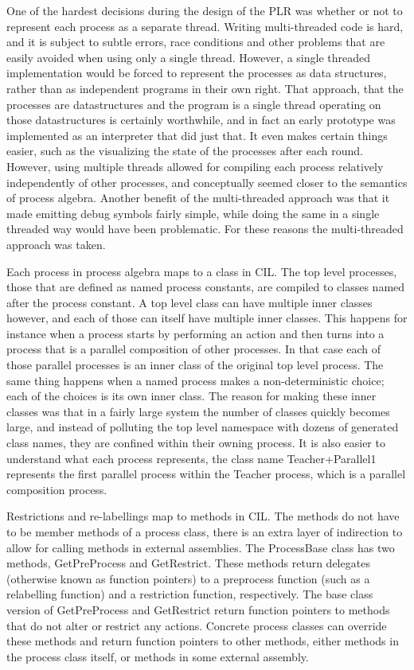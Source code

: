 	One of the hardest decisions during the design of the PLR was whether or not 
	to represent each process as a separate thread. Writing multi-threaded code 
	is hard, and it is subject to subtle errors, race conditions and other 
	problems that are easily avoided when using only a single thread. However, a 
	single threaded implementation would be forced to represent the processes as 
	data structures, rather than as independent programs in their own right. 
	That approach, that the processes are datastructures and the program is a 
	single thread operating on those datastructures is certainly worthwhile, and 
	in fact an early prototype was implemented as an interpreter that did just 
	that. It even makes certain things easier, such as the visualizing the state 
	of the processes after each round. However, using multiple threads allowed 
	for compiling each process relatively independently of other processes, and 
	conceptually seemed closer to the semantics of process algebra. Another
	benefit of the multi-threaded approach was that it made emitting debug 
	symbols fairly simple, while doing the same in a single threaded way would 
	have been problematic. For these reasons the multi-threaded approach was 
	taken.
	
	Each process in process algebra maps to a class in CIL. The top level 
	processes, those that are defined as named process constants, are compiled
	to classes named after the process constant. A top level class can have
	multiple inner classes however, and each of those can itself have multiple
	inner classes. This happens for instance when a process starts by performing
	an action and then turns into a process that is a parallel composition of 
	other processes. In that case each of those parallel processes is an inner
	class of the original top level process. The same thing happens when a 
	named process makes a non-deterministic choice; each of the choices is its
	own inner class. The reason for making these inner classes was that in a
	fairly large system the number of classes quickly becomes large,
	and instead of polluting the top level namespace with dozens of generated 
	class	names, they are confined within their owning process. It is also
	easier to understand what each process represents, the class name
	\textsf{Teacher+Parallel1} represents the first parallel process within
	the \textsf{Teacher} process, which is a parallel composition process.
	
	Restrictions and re-labellings map to methods in CIL. The methods do not
	have to be member methods of a process class, there is an extra layer
	of indirection to allow for calling methods in external assemblies. The
	\textsf{ProcessBase} class has two methods, \textsf{GetPreProcess} and 
	\textsf{GetRestrict}. These methods return delegates (otherwise known as
	function pointers) to a preprocess function (such as a relabelling function)
	and a restriction function, respectively. The base class version of
	\textsf{GetPreProcess} and \textsf{GetRestrict} return function pointers to
	methods that do not alter or restrict any actions. Concrete process classes
	can override these methods and return function pointers to other methods,
	either methods in the process class itself, or methods in some external
	assembly.


